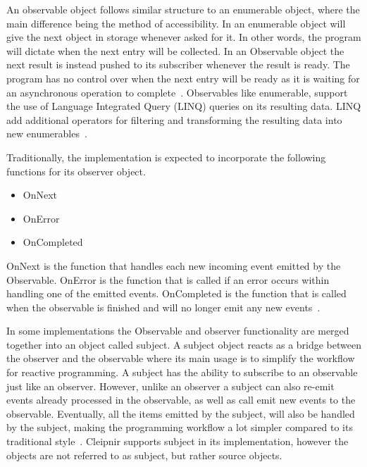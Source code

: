 An observable object follows similar structure to an enumerable object, where the main difference being the method of accessibility. In an enumerable object will give the next object in storage whenever asked for it. In other words, the program will dictate when the next entry will be collected. In an Observable object the next result is instead pushed to its subscriber whenever the result is ready. The program has no control over when the next entry will be ready as it is waiting for an asynchronous operation to complete~\cites{WEB:ReactiveObservable, VIDEO:dotnetsheffReactive, VIDEO:MicroDev}[p.~15]{BOOK:RxLinq}. Observables like enumerable, support the use of Language Integrated Query (LINQ) queries on its resulting data. LINQ add additional operators for filtering and transforming the resulting data into new enumerables~\cites{VIDEO:dotnetsheffReactive}[p.~3-4]{BOOK:RxLinq}[p.~208]{BOOK:DotnetMultithreadCookBook}.

Traditionally, the implementation is expected to incorporate the following functions for its observer object.
\begin{itemize}
	\item{OnNext}
	\item{OnError}
	\item{OnCompleted}
\end{itemize}

OnNext is the function that handles each new incoming event emitted by the Observable. OnError is the function that is called if an error occurs within handling one of the emitted events. OnCompleted is the function that is called when the observable is finished and will no longer emit any new events~\cite{WEB:ReactiveObservable}.

In some implementations the Observable and observer functionality are merged together into an object called subject. A subject object reacts as a bridge between the observer and the observable where its main usage is to simplify the workflow for reactive programming. A subject has the ability to subscribe to an observable just like an observer. However, unlike an observer a subject can also re-emit events already processed in the observable, as well as call emit new events to the observable. Eventually, all the items emitted by the subject, will also be handled by the subject, making the programming workflow a lot simpler compared to its traditional style~\cite{WEB:ReactiveSubject}. Cleipnir supports subject in its implementation, however the objects are not referred to as subject, but rather source objects. 

\iffalse
-a brief introduce reactive programming
-usecase
-the ReactiveX library(what it does, how it works and the mention Rx.Net)
-give brief through workflow, concepts with name and definitions and how it works.(Observable, stream of data, subjects, event driven programming)
-mention briefly Cleipnir support for reactive programming, how they differ, say detail information is given in Cleipnir chapter.
\fi
